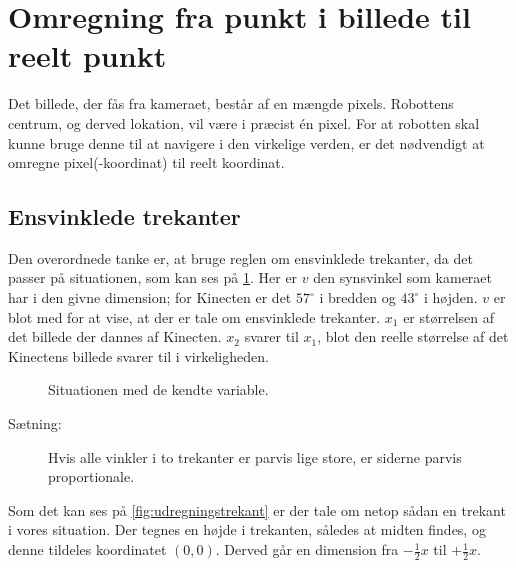 \section{Omregning fra punkt i billede til reelt punkt}\label{lokalisering:punktomregning}
Det billede, der fås fra kameraet, består af en mængde pixels.
Robottens centrum, og derved lokation, vil være i præcist én pixel.
For at robotten skal kunne bruge denne til at navigere i den virkelige verden, er det nødvendigt at omregne pixel(-koordinat) til reelt koordinat.

\subsection{Ensvinklede trekanter}
Den overordnede tanke er, at bruge reglen om ensvinklede trekanter, da det passer på situationen, som kan ses på \cref{fig:kameratrekant}.
Her er $v$ den synsvinkel som kameraet har i den givne dimension; for Kinecten er det $57^\circ$ i bredden og $43^\circ$ i højden.
$v$ er blot med for at vise, at der er tale om ensvinklede trekanter.
$x_1$ er størrelsen af det billede der dannes af Kinecten.
$x_2$ svarer til $x_1$, blot den reelle størrelse af det Kinectens billede svarer til i virkeligheden.

\begin{figure}[h]
\centering
{}
\caption{Situationen med de kendte variable.}
\label{fig:kameratrekant}
\end{figure}

\begin{description}
\item[Sætning:]{Hvis alle vinkler i to trekanter er parvis lige store, er siderne parvis proportionale.}
\end{description}
Som det kan ses på \cref{fig:udregningstrekant} er der tale om netop sådan en trekant i vores situation.
Der tegnes en højde i trekanten, således at midten findes, og denne tildeles koordinatet $(0,0)$. 
Derved går en dimension fra $-\frac{1}{2}x$ til $+\frac{1}{2}x$.

